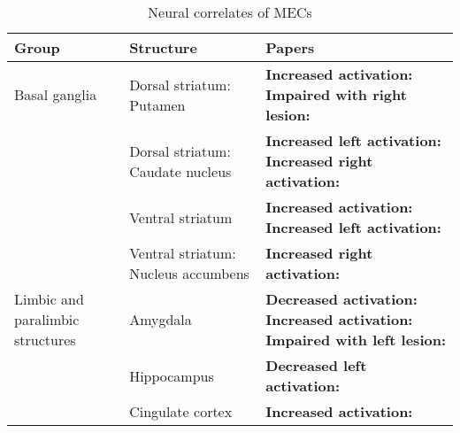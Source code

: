 \begin{table}[t!]
\centering
\scriptsize
\def\arraystretch{1.2}

\begin{threeparttable}
\caption{Neural correlates of MECs}
\label{tab:rev-4}

\begin{tabular*}{\textwidth}{
    >{\raggedright}p{}
    >{\raggedright}p{}
    >{\raggedright\arraybackslash}p{}}

\hline

\textbf{Group} & \textbf{Structure} & \textbf{Papers} \\ 

\hline
Basal ganglia & Dorsal striatum: Putamen & 
    \textbf{Increased activation:} \textcite{klepzig2020} 
    \newline 
    \textbf{Impaired with right lesion:} \textcite{satoh2016} \\ 

\cline{2-3}   
& Dorsal striatum: Caudate nucleus & 
    \textbf{Increased left activation:} \textcite{klepzig2020} 
    \newline 
    \textbf{Increased right activation:} \textcite{salimpoor2011} \\

\cline{2-3}
& Ventral striatum & 
    \textbf{Increased activation:} \textcite{grunkina2017} 
    \newline 
    \textbf{Increased left activation:} \textcite{blood2001} \\
    
\cline{2-3}
& Ventral striatum: Nucleus accumbens & 
    \textbf{Increased right activation:} \textcite{salimpoor2011} \\

\hline
Limbic and paralimbic structures & Amygdala & 
    \textbf{Decreased activation:} \textcite{blood2001} 
    \newline 
    \textbf{Increased activation:} \textcite{grunkina2017} 
    \newline 
    \textbf{Impaired with left lesion:} \textcite{griffiths2004} \\

\cline{2-3}
& Hippocampus & 
    \textbf{Decreased left activation:} \textcite{blood2001} \\ 
    
\cline{2-3}
& Cingulate cortex & 
    \textbf{Increased activation:} \textcite{blood2001} \\
    

\end{tabular*}
\end{threeparttable}
\end{table}
